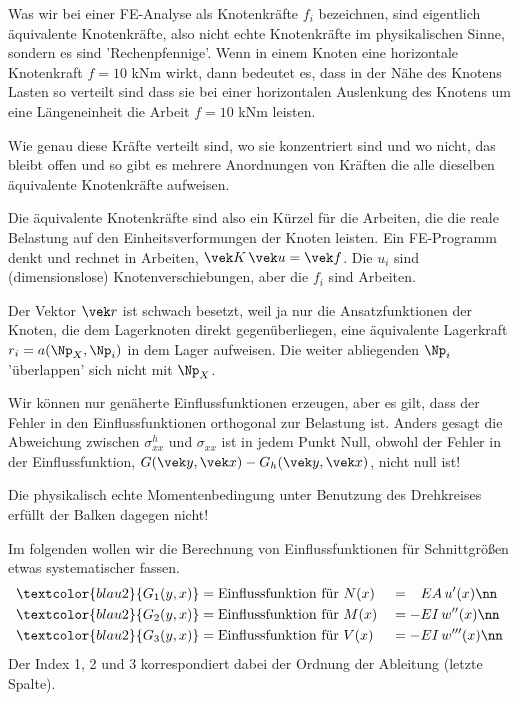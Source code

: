 Was wir bei einer FE-Analyse als Knotenkr\"{a}fte $f_i $ bezeichnen, sind eigentlich \"{a}quivalente Knotenkr\"{a}fte, also nicht echte Knotenkr\"{a}fte im physikalischen Sinne, sondern es sind 'Rechenpfennige'. Wenn in einem Knoten eine horizontale  Knotenkraft $f = 10$ kNm wirkt, dann bedeutet es, dass in der N\"{a}he des Knotens Lasten so verteilt sind dass sie bei einer horizontalen Auslenkung des Knotens um eine L\"{a}ngeneinheit die Arbeit $f = 10$ kNm leisten.

Wie genau diese Kr\"{a}fte verteilt sind, wo sie konzentriert sind und wo nicht, das bleibt offen und so gibt es mehrere Anordnungen von Kr\"{a}ften die alle dieselben \"{a}quivalente Knotenkr\"{a}fte aufweisen.

Die \"{a}quivalente Knotenkr\"{a}fte sind also ein K\"{u}rzel f\"{u}r die Arbeiten, die die reale Belastung auf den Einheitsverformungen der Knoten leisten. Ein FE-Programm denkt und rechnet in Arbeiten, $\vek K\,\vek u = \vek f$. Die $u_i $ sind (dimensionslose) Knotenverschiebungen, aber die $f_i $ sind Arbeiten.


\begin{remark}
Der Vektor $\vek r$ ist schwach besetzt, weil ja nur die Ansatzfunktionen der Knoten, die dem Lagerknoten direkt gegen\"{u}berliegen, eine \"{a}quivalente Lagerkraft $r_i = a(\Np_X,\Np_i)$ in dem Lager aufweisen. Die weiter abliegenden $\Np_i$ '\"{u}berlappen' sich nicht mit $\Np_X$.
\end{remark}

Wir k\"{o}nnen nur gen\"{a}herte Einflussfunktionen erzeugen, aber es gilt, dass der Fehler in den Einflussfunktionen orthogonal zur Belastung ist. Anders gesagt die Abweichung zwischen $\sigma_{xx}^h$ und $\sigma_{xx}$ ist in jedem Punkt Null, obwohl der Fehler in der Einflussfunktion, $G(\vek y,\vek x) - G_h(\vek y,\vek x)$, nicht null ist!



Die physikalisch echte Momentenbedingung unter Benutzung des Drehkreises erf\"{u}llt der Balken dagegen nicht!


Im folgenden wollen wir die Berechnung von Einflussfunktionen f\"{u}r Schnitt\-gr\"{o}{\ss}en etwas systematischer fassen.
\begin{alignat}{2}
\textcolor{blau2}{G_1(y,x)} &= \text{Einflussfunktion f\"{u}r $N(x)$} &&= \phantom{-}EA\,u'(x)\nn \\
\textcolor{blau2}{G_2(y,x)} &= \text{Einflussfunktion f\"{u}r $M(x)$} &&= -EI\,w''(x)\nn \\
\textcolor{blau2}{G_3(y,x)} &= \text{Einflussfunktion f\"{u}r $V(x)$} &&= -EI\,w'''(x)\nn
\end{alignat}
Der Index 1, 2 und 3 korrespondiert dabei der Ordnung der Ableitung (letzte Spalte).

